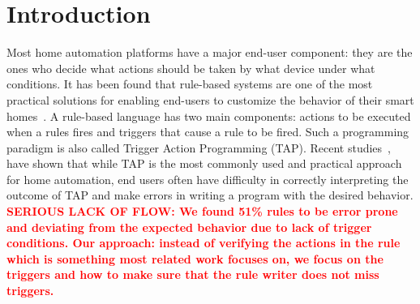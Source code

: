 \documentclass{sig-alternate-05-2015}
\newcommand\todo[1]{\textbf{\textcolor{red}{#1}}}
\begin{document}
\maketitle
\begin{abstract}
[\todo {Write abstract}]
\end{abstract}

\printccsdesc



\section{Introduction}
Most home automation platforms have a major end-user component: they are the ones who decide what actions should be taken by what device under what conditions. It has been found that rule-based systems are one of the most practical solutions for enabling end-users to customize the behavior of their smart homes~\cite{practical-tap}. A rule-based language has two main components: actions to be executed when a rules fires and triggers that cause a rule to be fired. Such a programming paradigm is also called Trigger Action Programming (TAP). Recent studies~\cite{Huang},\cite{wild-tap} have shown that while TAP is the most commonly used and practical approach for home automation, end users often have difficulty in correctly interpreting the outcome of TAP and make errors in writing a program with the desired behavior. 
\todo{SERIOUS LACK OF FLOW: We found 51\% rules to be error prone and deviating from the expected behavior due to lack of trigger conditions. Our approach: instead of verifying the actions in the rule which is something most related work focuses on, we focus on the triggers and how to make sure that the rule writer does not miss triggers. }
\end{document}
